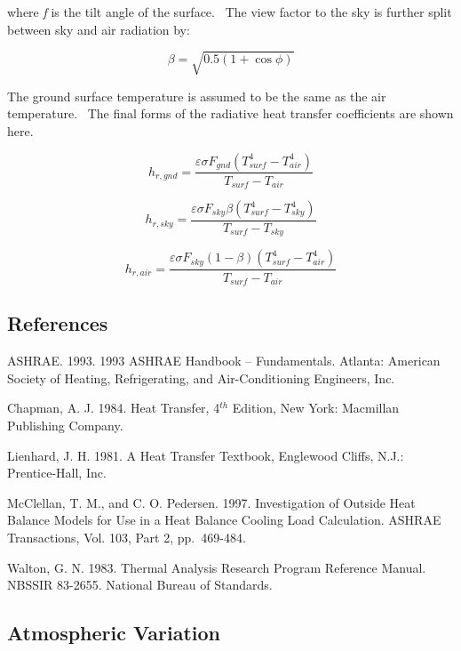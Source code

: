 where \emph{f} is the tilt angle of the surface.~ The view factor to the sky is further split between sky and air radiation by:

\begin{equation}
\beta  = \sqrt {0.5\left( {1 + \cos \phi } \right)}
\end{equation}

The ground surface temperature is assumed to be the same as the air temperature.~ The final forms of the radiative heat transfer coefficients are shown here.

\begin{equation}
{h_{r,gnd}} = \frac{{\varepsilon \sigma {F_{gnd}}(T_{surf}^4 - T_{air}^4)}}{{{T_{surf}} - {T_{air}}}}
\end{equation}

\begin{equation}
{h_{r,sky}} = \frac{{\varepsilon \sigma {F_{sky}}\beta (T_{surf}^4 - T_{sky}^4)}}{{{T_{surf}} - {T_{sky}}}}
\end{equation}

\begin{equation}
{h_{r,air}} = \frac{{\varepsilon \sigma {F_{sky}}\left( {1 - \beta } \right)(T_{surf}^4 - T_{air}^4)}}{{{T_{surf}} - {T_{air}}}}
\end{equation}

\subsection{References}\label{references-034}

ASHRAE. 1993. 1993 ASHRAE Handbook -- Fundamentals. Atlanta: American Society of Heating, Refrigerating, and Air-Conditioning Engineers, Inc.

Chapman, A. J. 1984. Heat Transfer, 4\(^{th}\) Edition, New York: Macmillan Publishing Company.

Lienhard, J. H. 1981. A Heat Transfer Textbook, Englewood Cliffs, N.J.: Prentice-Hall, Inc.

McClellan, T. M., and C. O. Pedersen. 1997. Investigation of Outside Heat Balance Models for Use in a Heat Balance Cooling Load Calculation. ASHRAE Transactions, Vol. 103, Part 2, pp.~469-484.

Walton, G. N. 1983. Thermal Analysis Research Program Reference Manual. NBSSIR 83-2655. National Bureau of Standards.

\subsection{Atmospheric Variation}\label{atmospheric-variation}

